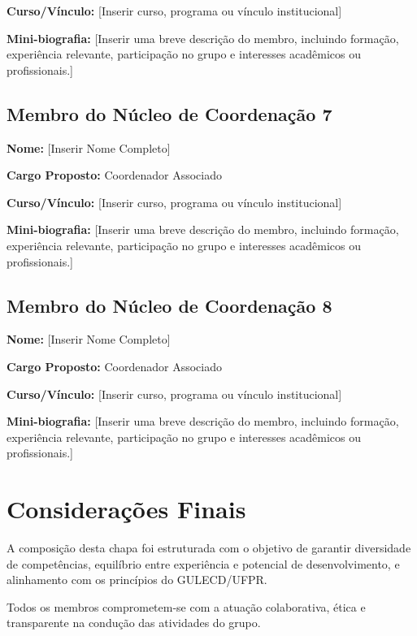 \documentclass[11pt,a4paper]{article}
\begin{document}
\textbf{Curso/Vínculo:} [Inserir curso, programa ou vínculo institucional]

\textbf{Mini-biografia:}  
[Inserir uma breve descrição do membro, incluindo formação, experiência relevante, participação no grupo e interesses acadêmicos ou profissionais.]

\vspace{1em}

\subsection{Membro do Núcleo de Coordenação 7}

\textbf{Nome:} [Inserir Nome Completo]

\textbf{Cargo Proposto:} Coordenador Associado

\textbf{Curso/Vínculo:} [Inserir curso, programa ou vínculo institucional]

\textbf{Mini-biografia:}  
[Inserir uma breve descrição do membro, incluindo formação, experiência relevante, participação no grupo e interesses acadêmicos ou profissionais.]

\vspace{1em}

\subsection{Membro do Núcleo de Coordenação 8}

\textbf{Nome:} [Inserir Nome Completo]

\textbf{Cargo Proposto:} Coordenador Associado

\textbf{Curso/Vínculo:} [Inserir curso, programa ou vínculo institucional]

\textbf{Mini-biografia:}  
[Inserir uma breve descrição do membro, incluindo formação, experiência relevante, participação no grupo e interesses acadêmicos ou profissionais.]

\section{Considerações Finais}

A composição desta chapa foi estruturada com o objetivo de garantir diversidade de competências, equilíbrio entre experiência e potencial de desenvolvimento, e alinhamento com os princípios do GULECD/UFPR.

Todos os membros comprometem-se com a atuação colaborativa, ética e transparente na condução das atividades do grupo.
\end{document}
